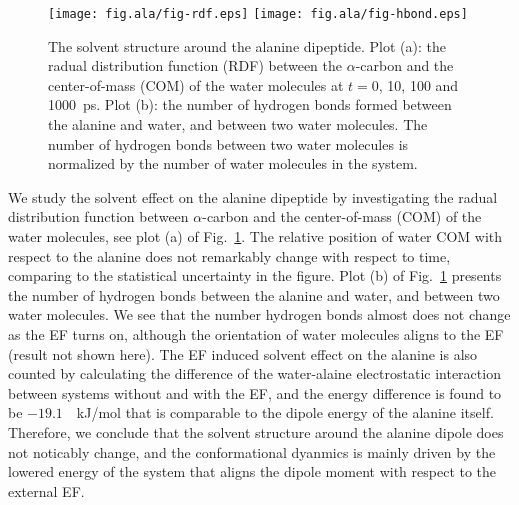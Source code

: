 \documentclass[a4paper,preprint,unsortedaddress,onecolumn]{revtex4-1}
\begin{document}

\begin{figure}
  \centering
  \texttt{[image: fig.ala/fig-rdf.eps]}
  \texttt{[image: fig.ala/fig-hbond.eps]}
  \caption{The solvent structure around the alanine dipeptide.  Plot
    (a): the radual distribution function (RDF) between the
    $\alpha$-carbon and the center-of-mass (COM) of the water molecules at
    $t = 0$, 10, 100 and 1000~ps.  Plot (b): the number of hydrogen
    bonds formed between the alanine and water, and between two water
    molecules.  The number of hydrogen bonds between two water
    molecules is normalized by the number of water molecules in the
    system.}
  \label{fig:tmp7a}
\end{figure}

We study the solvent effect on the alanine dipeptide by investigating
the radual distribution function between $\alpha$-carbon and the
center-of-mass (COM) of the water molecules, see plot (a) of
Fig.~\ref{fig:tmp7a}. The relative position of water COM with respect
to the alanine does not remarkably change with respect to time,
comparing to the statistical uncertainty in the figure. Plot (b) of
Fig.~\ref{fig:tmp7a} presents the number of hydrogen bonds between the
alanine and water, and between two water molecules. We see that the
number hydrogen bonds almost does not change as the EF turns on,
although the orientation of water molecules aligns to the EF (result
not shown here). 
The EF induced solvent effect on the alanine is also counted by calculating the
difference of the water-alaine electrostatic interaction 
between systems without and with the EF, and the
energy difference is found to be $-19.1$~~kJ/mol that is
comparable to the dipole energy of the alanine itself.
Therefore, we conclude that the solvent structure around the
alanine dipole does not noticably change, and the conformational
dyanmics is mainly driven by the lowered 
energy of the system that aligns the dipole moment with respect to the external EF.
\end{document}
